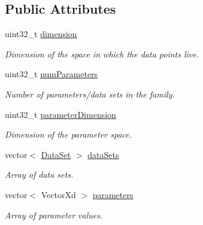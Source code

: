 \subsection*{Public Attributes}
\begin{DoxyCompactItemize}
\item 
\hypertarget{struct_d_r_d_s_p_1_1_data_system_ab6aefaa08cd0a5b6a9e83105ecd56289}{uint32\-\_\-t \hyperlink{struct_d_r_d_s_p_1_1_data_system_ab6aefaa08cd0a5b6a9e83105ecd56289}{dimension}}\label{struct_d_r_d_s_p_1_1_data_system_ab6aefaa08cd0a5b6a9e83105ecd56289}

\begin{DoxyCompactList}\small\item\em Dimension of the space in which the data points live. \end{DoxyCompactList}\item 
\hypertarget{struct_d_r_d_s_p_1_1_data_system_a621ef4f4452821030bb57e93dadf334e}{uint32\-\_\-t \hyperlink{struct_d_r_d_s_p_1_1_data_system_a621ef4f4452821030bb57e93dadf334e}{num\-Parameters}}\label{struct_d_r_d_s_p_1_1_data_system_a621ef4f4452821030bb57e93dadf334e}

\begin{DoxyCompactList}\small\item\em Number of parameters/data sets in the family. \end{DoxyCompactList}\item 
\hypertarget{struct_d_r_d_s_p_1_1_data_system_ac494c5833ae14e805cd1d0a8b8e52143}{uint32\-\_\-t \hyperlink{struct_d_r_d_s_p_1_1_data_system_ac494c5833ae14e805cd1d0a8b8e52143}{parameter\-Dimension}}\label{struct_d_r_d_s_p_1_1_data_system_ac494c5833ae14e805cd1d0a8b8e52143}

\begin{DoxyCompactList}\small\item\em Dimension of the parameter space. \end{DoxyCompactList}\item 
\hypertarget{struct_d_r_d_s_p_1_1_data_system_a5fe0b41909f9056f986b4284e0fcb614}{vector$<$ \hyperlink{struct_d_r_d_s_p_1_1_data_set}{Data\-Set} $>$ \hyperlink{struct_d_r_d_s_p_1_1_data_system_a5fe0b41909f9056f986b4284e0fcb614}{data\-Sets}}\label{struct_d_r_d_s_p_1_1_data_system_a5fe0b41909f9056f986b4284e0fcb614}

\begin{DoxyCompactList}\small\item\em Array of data sets. \end{DoxyCompactList}\item 
\hypertarget{struct_d_r_d_s_p_1_1_data_system_aae14ac3e8c2e1a397759cd3a4d8a102f}{vector$<$ Vector\-Xd $>$ \hyperlink{struct_d_r_d_s_p_1_1_data_system_aae14ac3e8c2e1a397759cd3a4d8a102f}{parameters}}\label{struct_d_r_d_s_p_1_1_data_system_aae14ac3e8c2e1a397759cd3a4d8a102f}

\begin{DoxyCompactList}\small\item\em Array of parameter values. \end{DoxyCompactList}\end{DoxyCompactItemize}


